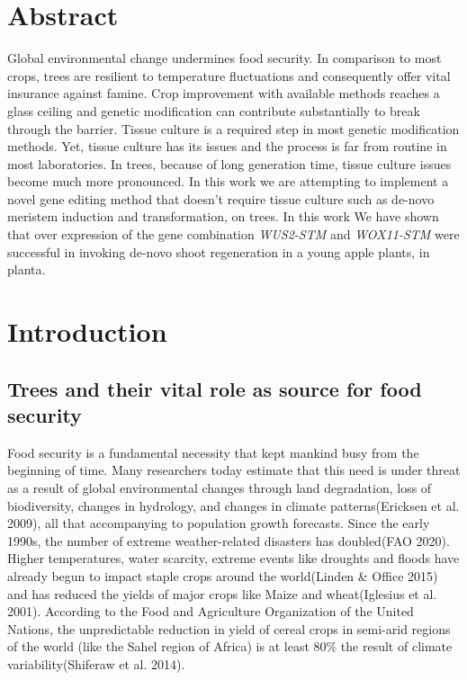 \documentclass[
]{article}
\begin{document}
\hypertarget{abstract}{%
\section{Abstract}\label{abstract}}

Global environmental change undermines food security. In comparison to
most crops, trees are resilient to temperature fluctuations and
consequently offer vital insurance against famine. Crop improvement with
available methods reaches a glass ceiling and genetic modification can
contribute substantially to break through the barrier. Tissue culture is
a required step in most genetic modification methods. Yet, tissue
culture has its issues and the process is far from routine in most
laboratories. In trees, because of long generation time, tissue culture
issues become much more pronounced. In this work we are attempting to
implement a novel gene editing method that doesn't require tissue
culture such as de-novo meristem induction and transformation, on trees.
In this work We have shown that over expression of the gene combination
\emph{WUS2-STM} and \emph{WOX11-STM} were successful in invoking de-novo
shoot regeneration in a young apple plants, in planta.

\hypertarget{introduction}{%
\section{Introduction}\label{introduction}}

\hypertarget{trees-and-their-vital-role-as-source-for-food-security}{%
\subsection{Trees and their vital role as source for food
security}\label{trees-and-their-vital-role-as-source-for-food-security}}

Food security is a fundamental necessity that kept mankind busy from the
beginning of time. Many researchers today estimate that this need is
under threat as a result of global environmental changes through land
degradation, loss of biodiversity, changes in hydrology, and changes in
climate patterns(Ericksen et al. 2009), all that accompanying to
population growth forecasts. Since the early 1990s, the number of
extreme weather-related disasters has doubled(FAO 2020). Higher
temperatures, water scarcity, extreme events like droughts and floods
have already begun to impact staple crops around the world(Linden \&
Office 2015) and has reduced the yields of major crops like Maize and
wheat(Iglesius et al. 2001). According to the Food and Agriculture
Organization of the United Nations, the unpredictable reduction in yield
of cereal crops in semi-arid regions of the world (like the Sahel region
of Africa) is at least 80\% the result of climate variability(Shiferaw
et al. 2014).
\end{document}

